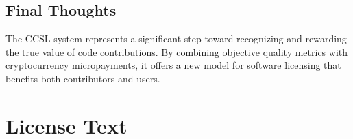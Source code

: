 \documentclass[11pt,a4paper]{report}
\begin{document}
\section{Final Thoughts}
The CCSL system represents a significant step toward recognizing and rewarding the true value of code contributions. By combining objective quality metrics with cryptocurrency micropayments, it offers a new model for software licensing that benefits both contributors and users.

\appendix
\chapter{License Text}

\end{document}
